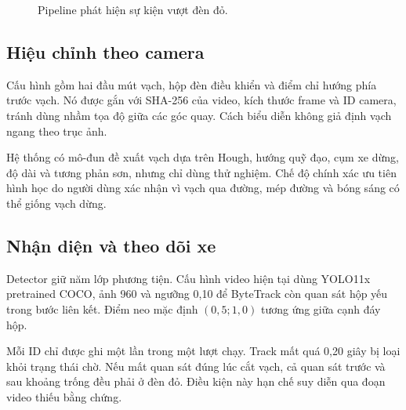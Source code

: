 \documentclass[11pt,a4paper]{article}
\begin{document}
\begin{figure}[t]
\centering
{}
\caption{Pipeline phát hiện sự kiện vượt đèn đỏ.}
\label{fig:pipeline}
\end{figure}

\subsection{Hiệu chỉnh theo camera}
Cấu hình gồm hai đầu mút vạch, hộp đèn điều khiển và điểm chỉ hướng phía trước vạch. Nó được gắn với SHA-256 của video, kích thước frame và ID camera, tránh dùng nhầm tọa độ giữa các góc quay. Cách biểu diễn không giả định vạch ngang theo trục ảnh.

Hệ thống có mô-đun đề xuất vạch dựa trên Hough, hướng quỹ đạo, cụm xe dừng, độ dài và tương phản sơn, nhưng chỉ dùng thử nghiệm. Chế độ chính xác ưu tiên hình học do người dùng xác nhận vì vạch qua đường, mép đường và bóng sáng có thể giống vạch dừng.

\subsection{Nhận diện và theo dõi xe}
Detector giữ năm lớp phương tiện. Cấu hình video hiện tại dùng YOLO11x pretrained COCO, ảnh 960 và ngưỡng 0,10 để ByteTrack còn quan sát hộp yếu trong bước liên kết. Điểm neo mặc định $(0{,}5;1{,}0)$ tương ứng giữa cạnh đáy hộp.

Mỗi ID chỉ được ghi một lần trong một lượt chạy. Track mất quá 0,20 giây bị loại khỏi trạng thái chờ. Nếu mất quan sát đúng lúc cắt vạch, cả quan sát trước và sau khoảng trống đều phải ở đèn đỏ. Điều kiện này hạn chế suy diễn qua đoạn video thiếu bằng chứng.
\end{document}
